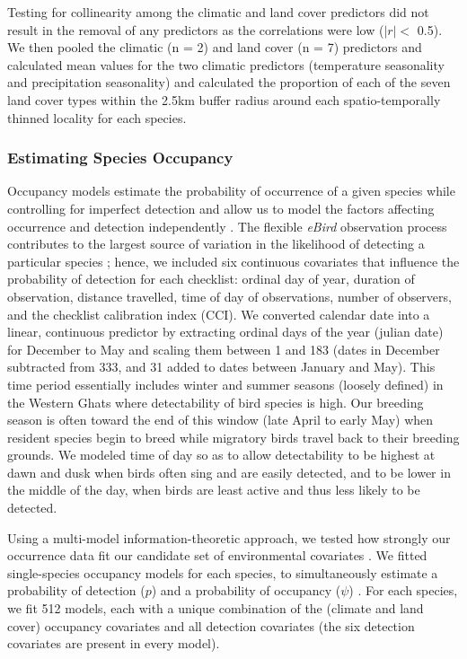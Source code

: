 Testing for collinearity among the climatic and land cover predictors did not result in the removal of any predictors as the correlations were low ($|r| <$ 0.5).
We then pooled the climatic (n = 2) and land cover (n = 7) predictors and calculated mean values for the two climatic predictors (temperature seasonality and precipitation seasonality) and calculated the proportion of each of the seven land cover types within the 2.5km buffer radius around each spatio-temporally thinned locality for each species.

\subsubsection*{Estimating Species Occupancy}

Occupancy models estimate the probability of occurrence of a given species while controlling for imperfect detection and allow us to model the factors affecting occurrence and detection independently \citep{mackenzie2017,johnston2018}.
The flexible \textit{eBird} observation process contributes to the largest source of variation in the likelihood of detecting a particular species \citep{johnston2021}; hence, we included six continuous covariates that influence the probability of detection for each checklist: ordinal day of year, duration of observation, distance travelled, time of day of observations, number of observers, and the checklist calibration index (CCI).
We converted calendar date into a linear, continuous predictor by extracting ordinal days of the year (julian date) for December to May and scaling them between 1 and 183 (dates in December subtracted from 333, and 31 added to dates between January and May).
This time period essentially includes winter and summer seasons (loosely defined) in the Western Ghats where detectability of bird species is high.
Our breeding season is often toward the end of this window (late April to early May) when resident species begin to breed while migratory birds travel back to their breeding grounds.
We modeled time of day so as to allow detectability to be highest at dawn and dusk when birds often sing and are easily detected, and to be lower in the middle of the day, when birds are least active and thus less likely to be detected.

Using a multi-model information-theoretic approach, we tested how strongly our occurrence data fit our candidate set of environmental covariates \citep{burnham2002}.
We fitted single-species occupancy models for each species, to simultaneously estimate a probability of detection ($p$) and a probability of occupancy ($\psi$) \citep{mackenzie2002,fiske2011}.
For each species, we fit 512 models, each with a unique combination of the (climate and land cover) occupancy covariates and all detection covariates (the six detection covariates are present in every model).

